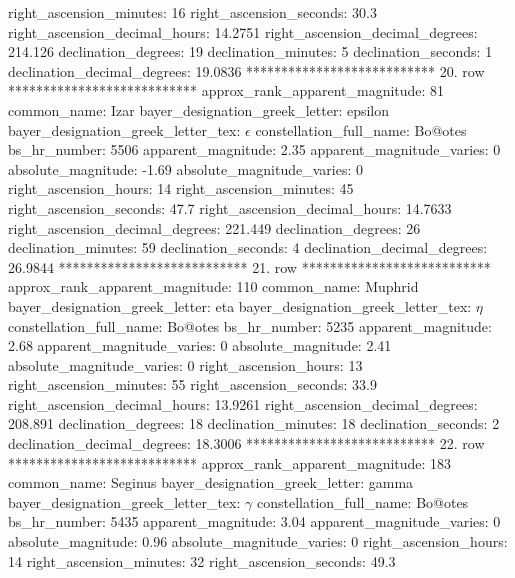            right_ascension_minutes: 16
           right_ascension_seconds: 30.3
     right_ascension_decimal_hours: 14.2751
   right_ascension_decimal_degrees: 214.126
               declination_degrees: 19
               declination_minutes: 5
               declination_seconds: 1
       declination_decimal_degrees: 19.0836
*************************** 20. row ***************************
    approx_rank_apparent_magnitude: 81
                       common_name: Izar
    bayer_designation_greek_letter: epsilon
bayer_designation_greek_letter_tex: $\epsilon$
           constellation_full_name: Bo@otes
                      bs_hr_number: 5506
                apparent_magnitude: 2.35
         apparent_magnitude_varies: 0
                absolute_magnitude: -1.69
         absolute_magnitude_varies: 0
             right_ascension_hours: 14
           right_ascension_minutes: 45
           right_ascension_seconds: 47.7
     right_ascension_decimal_hours: 14.7633
   right_ascension_decimal_degrees: 221.449
               declination_degrees: 26
               declination_minutes: 59
               declination_seconds: 4
       declination_decimal_degrees: 26.9844
*************************** 21. row ***************************
    approx_rank_apparent_magnitude: 110
                       common_name: Muphrid
    bayer_designation_greek_letter: eta
bayer_designation_greek_letter_tex: $\eta$
           constellation_full_name: Bo@otes
                      bs_hr_number: 5235
                apparent_magnitude: 2.68
         apparent_magnitude_varies: 0
                absolute_magnitude: 2.41
         absolute_magnitude_varies: 0
             right_ascension_hours: 13
           right_ascension_minutes: 55
           right_ascension_seconds: 33.9
     right_ascension_decimal_hours: 13.9261
   right_ascension_decimal_degrees: 208.891
               declination_degrees: 18
               declination_minutes: 18
               declination_seconds: 2
       declination_decimal_degrees: 18.3006
*************************** 22. row ***************************
    approx_rank_apparent_magnitude: 183
                       common_name: Seginus
    bayer_designation_greek_letter: gamma
bayer_designation_greek_letter_tex: $\gamma$
           constellation_full_name: Bo@otes
                      bs_hr_number: 5435
                apparent_magnitude: 3.04
         apparent_magnitude_varies: 0
                absolute_magnitude: 0.96
         absolute_magnitude_varies: 0
             right_ascension_hours: 14
           right_ascension_minutes: 32
           right_ascension_seconds: 49.3
